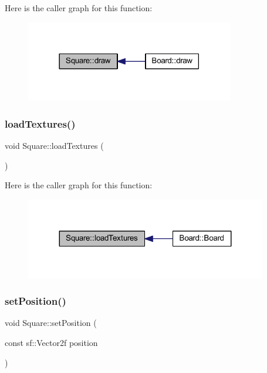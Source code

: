 Here is the caller graph for this function\+:\nopagebreak
\begin{figure}[H]
\begin{center}
\leavevmode
\includegraphics[width=258pt]{class_square_a6665fa34ce5e672a880a253b1a21fb78_icgraph}
\end{center}
\end{figure}
\mbox{\label{class_square_af03bbde12cc43feb90c4f0676e00ce72}} 
\subsubsection{\texorpdfstring{load\+Textures()}{loadTextures()}}
{\footnotesize\ttfamily void Square\+::load\+Textures (\begin{DoxyParamCaption}{ }\end{DoxyParamCaption})\hspace{0.3cm}{\ttfamily [static]}}

Here is the caller graph for this function\+:\nopagebreak
\begin{figure}[H]
\begin{center}
\leavevmode
\includegraphics[width=299pt]{class_square_af03bbde12cc43feb90c4f0676e00ce72_icgraph}
\end{center}
\end{figure}
\mbox{\label{class_square_a9040f1ca39b88b8d9ac2a90648b1fb20}} 
\subsubsection{\texorpdfstring{set\+Position()}{setPosition()}}
{\footnotesize\ttfamily void Square\+::set\+Position (\begin{DoxyParamCaption}\item[{const sf\+::\+Vector2f}]{position }\end{DoxyParamCaption})}

